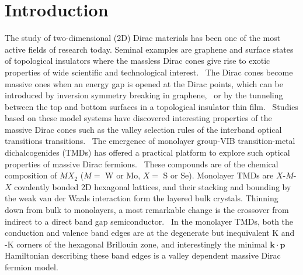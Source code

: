 \documentclass[prb,twocolumn,amsmath,amssymb,superscriptaddress,showpacs]{revtex4}
\begin{document}
 \date{\today}


 \maketitle


\section{Introduction}

The study of two-dimensional (2D) Dirac materials has been one of the most active fields of research today. Seminal examples are graphene and surface states of topological insulators where the massless Dirac cones give rise to exotic properties of wide scientific and technological interest.~\cite{Rise of Graphene, RMP TI, RMP XL Qi} The Dirac cones become massive ones when an energy gap is opened at the Dirac points, which can be introduced by inversion symmetry breaking in graphene,~\cite{Xiao and Yao PRL07, Yao Valleyoptics 08} or by the tunneling between the top and bottom surfaces in a topological insulator thin film.~\cite{Hz MDF TI PRB10}
Studies based on these model systems have discovered interesting properties of the massive Dirac cones such as the valley selection rules of the interband optical transitions transitions.~\cite{Yao Valleyoptics 08}
The emergence of monolayer group-VIB transition-metal dichalcogenides (TMDs) has offered a practical platform to explore such optical properties of massive Dirac fermions.~\cite{QH Wang nnano rev12, nphys TMDs rev14, Guibin rev15}
These compounds are of the chemical composition of $MX_2$ ($M=$ W or Mo, $X=$ S or Se). Monolayer TMDs are $X$-$M$-$X$ covalently bonded 2D hexagonal lattices, and their stacking and bounding by the weak van der Waals interaction form the layered bulk crystals. Thinning down from bulk to monolayers, a most remarkable change is the crossover from indirect to a direct band gap semiconductor.~\cite{Mak MoS2 PRL2010, Feng Wang nanolett2010, Direct Gap nnano tech2014}
In the monolayer TMDs, both the conduction and valence band edges are at the degenerate but inequivalent K and -K corners of the hexagonal Brillouin zone, and interestingly the minimal $\mathbf{k \cdot p}$ Hamiltonian describing these band edges is a valley dependent massive Dirac fermion model.~\cite{Yao Coupled Spin Valley 2012}
\end{document}
